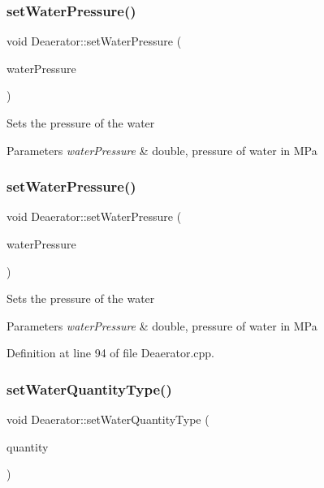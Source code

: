 \subsubsection{\texorpdfstring{set\+Water\+Pressure()}{setWaterPressure()}\hspace{0.1cm}{\footnotesize\ttfamily [2/3]}}
{\footnotesize\ttfamily void Deaerator\+::set\+Water\+Pressure (\begin{DoxyParamCaption}\item[{double}]{water\+Pressure }\end{DoxyParamCaption})}

Sets the pressure of the water 
\begin{DoxyParams}{Parameters}
{\em water\+Pressure} & double, pressure of water in M\+Pa \\
\hline
\end{DoxyParams}
\mbox{\label{class_deaerator_ae23f64c6983daed388a73c033a15e176}} 
\subsubsection{\texorpdfstring{set\+Water\+Pressure()}{setWaterPressure()}\hspace{0.1cm}{\footnotesize\ttfamily [3/3]}}
{\footnotesize\ttfamily void Deaerator\+::set\+Water\+Pressure (\begin{DoxyParamCaption}\item[{double}]{water\+Pressure }\end{DoxyParamCaption})}

Sets the pressure of the water 
\begin{DoxyParams}{Parameters}
{\em water\+Pressure} & double, pressure of water in M\+Pa \\
\hline
\end{DoxyParams}


Definition at line 94 of file Deaerator.\+cpp.

\mbox{\label{class_deaerator_ac60ad3d6650ed6c7783d18833bb7e3dd}} 
\subsubsection{\texorpdfstring{set\+Water\+Quantity\+Type()}{setWaterQuantityType()}\hspace{0.1cm}{\footnotesize\ttfamily [1/3]}}
{\footnotesize\ttfamily void Deaerator\+::set\+Water\+Quantity\+Type (\begin{DoxyParamCaption}\item[{\hyperlink{class_steam_properties_ae0294bedf7d178c2d8fb6aed0f62fbff}{Steam\+Properties\+::\+Thermodynamic\+Quantity}}]{quantity }\end{DoxyParamCaption})}

